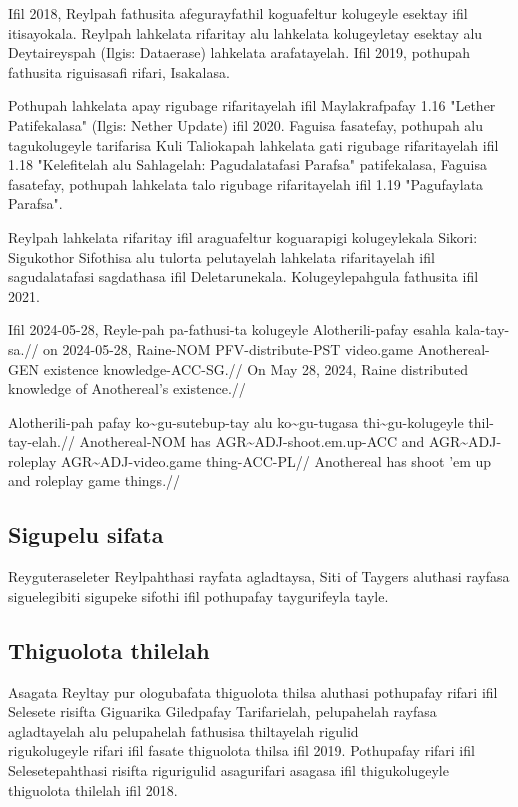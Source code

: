 Ifil 2018, Reylpah fathusita afegurayfathil koguafeltur kolugeyle esektay ifil itisayokala.
Reylpah lahkelata rifaritay alu lahkelata kolugeyletay esektay alu Deytaireyspah (Ilgis: Dataerase) lahkelata arafatayelah.
Ifil 2019, pothupah fathusita riguisasafi rifari, Isakalasa.

Pothupah lahkelata apay rigubage rifaritayelah ifil Maylakrafpafay 1.16 "Lether Patifekalasa" (Ilgis: Nether Update) ifil 2020.
Faguisa fasatefay, pothupah alu tagukolugeyle tarifarisa Kuli Taliokapah lahkelata gati rigubage rifaritayelah ifil 1.18 "Kelefitelah alu Sahlagelah: Pagudalatafasi Parafsa" patifekalasa, Faguisa fasatefay, pothupah lahkelata talo rigubage rifaritayelah ifil 1.19 "Pagufaylata Parafsa".

Reylpah lahkelata rifaritay ifil araguafeltur koguarapigi kolugeylekala Sikori: Sigukothor Sifothisa alu tulorta pelutayelah lahkelata rifaritayelah ifil sagudalatafasi sagdathasa ifil Deletarunekala.
Kolugeylepahgula fathusita ifil 2021.

\ex
\begingl
\gla Ifil 2024-05-28, Reyle-pah pa-fathusi-ta      kolugeyle  Alotherili-pafay esahla    kala-tay-sa.//
\glb  on   2024-05-28, Raine-NOM PFV-distribute-PST video.game Anothereal-GEN   existence knowledge-ACC-SG.//
\glft On May 28, 2024, Raine distributed knowledge of Anothereal's existence.//
\endgl
\xe

\ex
\begingl
\gla Alotherili-pah pafay ko\~{}gu-sutebup-tay       alu ko\~{}gu-tugasa     thi\~{}gu-kolugeyle   thil-tay-elah.//
\glb Anothereal-NOM has   AGR\~{}ADJ-shoot.em.up-ACC and AGR\~{}ADJ-roleplay AGR\~{}ADJ-video.game thing-ACC-PL//
\glft Anothereal has shoot 'em up and roleplay game things.//
\endgl
\xe

\subsection{Sigupelu sifata}
Reyguteraseleter Reylpahthasi rayfata agladtaysa, Siti of Taygers aluthasi rayfasa siguelegibiti sigupeke sifothi ifil pothupafay taygurifeyla tayle.

\subsection{Thiguolota thilelah}
Asagata Reyltay pur ologubafata thiguolota thilsa aluthasi pothupafay rifari ifil Selesete risifta Giguarika Giledpafay Tarifarielah, pelupahelah rayfasa agladtayelah alu pelupahelah fathusisa thiltayelah rigulid\\ rigukolugeyle rifari ifil fasate thiguolota thilsa ifil 2019.
Pothupafay rifari ifil Selesetepahthasi risifta rigurigulid asagurifari asagasa ifil thigukolugeyle thiguolota thilelah ifil 2018.

